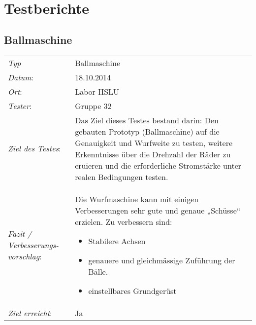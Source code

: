 \section{Testberichte}
\subsection{Ballmaschine}
\begin{tabular}{p{3.6cm}p{9.4cm}}
\textit{Typ}              & Ballmaschine \\ 
\textit{Datum}:           & 18.10.2014   \\
\textit{Ort}:             & Labor HSLU \\
\textit{Tester}:          & Gruppe 32 \\
\textit{Ziel des Testes}: & Das Ziel dieses Testes bestand darin: Den gebauten Prototyp (Ballmaschine) auf die Genauigkeit und Wurfweite zu testen, weitere Erkenntnisse über die Drehzahl der Räder zu eruieren und die erforderliche Stromstärke unter realen Bedingungen testen.  \\
\textit{Fazit / Verbesserungs-\newline vorschlag}: & Die Wurfmaschine kann mit einigen Verbesserungen sehr gute und genaue „Schüsse“ erzielen. Zu verbessern sind:
\begin{itemize}
    \item Stabilere Achsen
    \item genauere und gleichmässige Zuführung der Bälle.
    \item einstellbares Grundgerüst
\end{itemize}\\
\textit{Ziel erreicht}:& Ja\\
\end{tabular}
